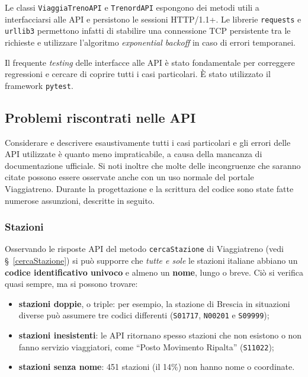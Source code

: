\documentclass[12pt,italian]{report}
\begin{document}
Le classi \texttt{ViaggiaTrenoAPI} e \texttt{TrenordAPI} espongono dei
metodi utili a interfacciarsi alle API e persistono le sessioni
HTTP/1.1+.  Le librerie \texttt{requests} e \texttt{urllib3}
permettono infatti di stabilire una connessione TCP persistente tra le
richieste e utilizzare l'algoritmo \textit{exponential backoff} in
caso di errori temporanei.

Il frequente \textit{testing} delle interfacce alle API è stato
fondamentale per correggere regressioni e cercare di coprire tutti i
casi particolari.  È stato utilizzato il framework \texttt{pytest}.

\subsection{Problemi riscontrati nelle API}

Considerare e descrivere esaustivamente tutti i casi particolari e gli
errori delle API utilizzate è quanto meno impraticabile, a causa della
mancanza di documentazione ufficiale.  Si noti inoltre che molte delle
incongruenze che saranno citate possono essere osservate anche con un
uso normale del portale Viaggiatreno.  Durante la progettazione e la
scrittura del codice sono state fatte numerose assunzioni, descritte
in seguito.

\subsubsection{Stazioni}

Osservando le risposte API del metodo \texttt{cercaStazione} di
Viaggiatreno (vedi \S~\ref{cercaStazione}) si può supporre che
\textit{tutte e sole} le stazioni italiane abbiano un \textbf{codice
    identificativo univoco} e almeno un \textbf{nome}, lungo o breve.
Ciò si verifica quasi sempre, ma si possono trovare:
\begin{itemize}
    \item \textbf{stazioni doppie}, o triple: per esempio, la stazione
    di Brescia in situazioni diverse può assumere tre codici
    differenti (\texttt{S01717}, \texttt{N00201} e \texttt{S09999});
    \item \textbf{stazioni inesistenti}: le API ritornano spesso
    stazioni che non esistono o non fanno servizio viaggiatori, come
    ``Posto Movimento Ripalta'' (\texttt{S11022});
    \item \textbf{stazioni senza nome}: 451 stazioni (il 14\%) non
    hanno nome o coordinate.
\end{itemize}
\end{document}
